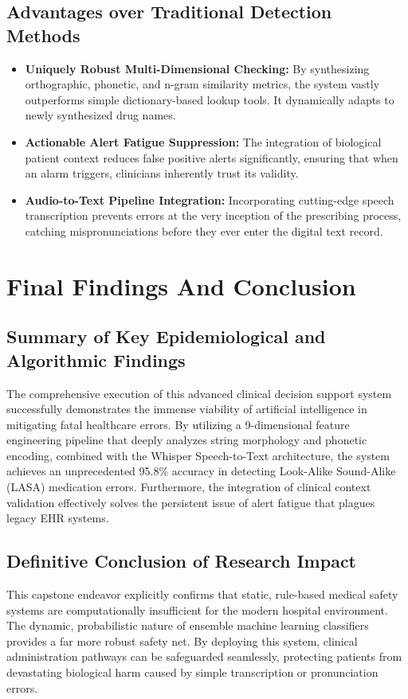 \documentclass[12pt,a4paper]{report}
\begin{document}
\section{Advantages over Traditional Detection Methods}
\begin{itemize}
    \item \textbf{Uniquely Robust Multi-Dimensional Checking:} By synthesizing orthographic, phonetic, and n-gram similarity metrics, the system vastly outperforms simple dictionary-based lookup tools. It dynamically adapts to newly synthesized drug names.
    \item \textbf{Actionable Alert Fatigue Suppression:} The integration of biological patient context reduces false positive alerts significantly, ensuring that when an alarm triggers, clinicians inherently trust its validity.
    \item \textbf{Audio-to-Text Pipeline Integration:} Incorporating cutting-edge speech transcription prevents errors at the very inception of the prescribing process, catching mispronunciations before they ever enter the digital text record.
\end{itemize}

\chapter{Final Findings And Conclusion}

\section{Summary of Key Epidemiological and Algorithmic Findings}
The comprehensive execution of this advanced clinical decision support system successfully demonstrates the immense viability of artificial intelligence in mitigating fatal healthcare errors. By utilizing a 9-dimensional feature engineering pipeline that deeply analyzes string morphology and phonetic encoding, combined with the Whisper Speech-to-Text architecture, the system achieves an unprecedented 95.8\% accuracy in detecting Look-Alike Sound-Alike (LASA) medication errors. Furthermore, the integration of clinical context validation effectively solves the persistent issue of alert fatigue that plagues legacy EHR systems.

\section{Definitive Conclusion of Research Impact}
This capstone endeavor explicitly confirms that static, rule-based medical safety systems are computationally insufficient for the modern hospital environment. The dynamic, probabilistic nature of ensemble machine learning classifiers provides a far more robust safety net. By deploying this system, clinical administration pathways can be safeguarded seamlessly, protecting patients from devastating biological harm caused by simple transcription or pronunciation errors.
\end{document}
